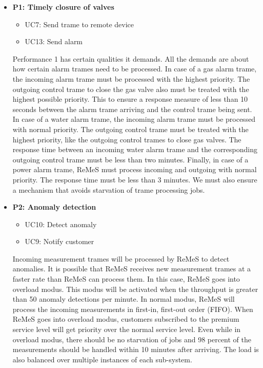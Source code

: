 \begin{itemize}
	\item \textbf{P1: Timely closure of valves}
	\begin{itemize}
		\item UC7: Send trame to remote device
		\item UC13: Send alarm
	\end{itemize}
	Performance 1 has certain qualities it demands. All the demands are about how certain alarm trames need to be processed. 
		In case of a gas alarm trame,
		the incoming alarm trame must be processed with the highest priority. The outgoing control trame to close the gas valve also must be treated with
		the highest possible priority. This to ensure a response measure of less than 10 seconds between the alarm trame arriving and the control trame
		being sent.
		In case of a water alarm trame, the incoming alarm trame must be processed with normal priority. The outgoing control trame must be treated with
		the highest priority, like the outgoing control trames to close gas valves. The response time between an incoming water alarm trame and the
		corresponding outgoing control trame must be less than two minutes.
		Finally, in case of a power alarm trame, ReMeS must process incoming and outgoing with normal priority. The response time must be less than 3 minutes.
		We must also ensure a mechanism that avoids starvation of trame processing jobs.

	
	\item \textbf{P2: Anomaly detection}
	\begin{itemize}
		\item UC10: Detect anomaly
		\item UC9: Notify customer
	\end{itemize}
	Incoming measurement trames will be processed by ReMeS to detect anomalies. It is possible that ReMeS receives new measurement trames at a
		faster rate than ReMeS can process them. In this case, ReMeS goes into overload modus. This modus will be activated when the throughput
		is greater than 50 anomaly detections per minute.
		In normal modus, ReMeS will process the incoming measurements in first-in, first-out order (FIFO). When ReMeS goes into overload modus,
		customers subscribed to the premium service level will get priority over the normal service level. Even while in overload modus, there
		should be no starvation of jobs and 98 percent of the measurements should be handled within 10 minutes after arriving.
		The load is also balanced over multiple instances of each sub-system.
	

\end{itemize}
